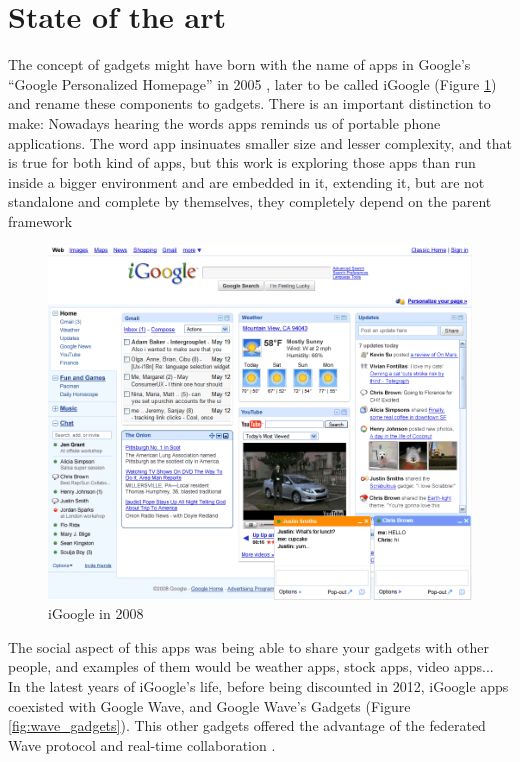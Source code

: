 \newpage
\section{State of the art}

The concept of gadgets might have born with the name of apps in Google's ``Google Personalized Homepage'' in 2005 \cite{ref:what_happened_to_igoogle}, later to be called iGoogle (Figure \ref{fig:igoogle_2008}) and rename these components to gadgets. There is an important distinction to make: Nowadays hearing the words apps reminds us of portable phone applications. The word app insinuates smaller size and lesser complexity, and that is true for both kind of apps, but this work is exploring those apps than run inside a bigger environment and are embedded in it, extending it, but are not standalone and complete by themselves, they completely depend on the parent framework\\[.2cm]
\begin{figure}[h]
  \center
    \includegraphics[keepaspectratio, scale=0.6]{Media/Captures/Soa/iGoogle.png}
  \caption{iGoogle in 2008}
  \label{fig:igoogle_2008}
\end{figure}
The social aspect of this apps was being able to share your gadgets with other people, and examples of them would be weather apps, stock apps, video apps...\\[.2cm]
In the latest years of iGoogle's life, before being discounted in 2012, iGoogle apps coexisted with Google Wave, and Google Wave's Gadgets (Figure \ref{fig:wave_gadgets}). This other gadgets offered the advantage of the federated Wave protocol and real-time collaboration \cite{ref:apache_wave_about}.\\[.2cm]
